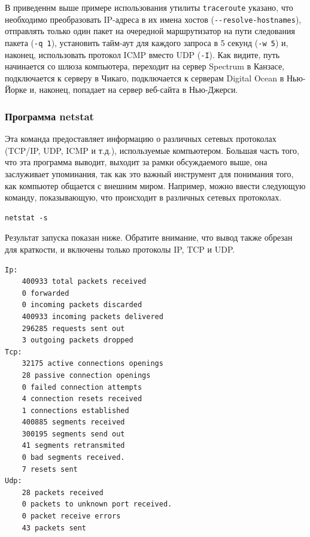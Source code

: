 \documentclass[12pt]{article}
\begin{document}
В приведеннм выше примере использования утилиты \texttt{traceroute} указано, что необходимо
преобразовать IP-адреса в их имена хостов
(\texttt{-\/-resolve-hostnames}), отправлять только один пакет на
очередной маршрутизатор на пути следования пакета (\texttt{-q\ 1}),
установить тайм-аут для каждого запроса в 5 секунд (\texttt{-w\ 5}) и,
наконец, использовать протокол ICMP вместо UDP (\texttt{-I}). Как
видите, путь начинается со шлюза компьютера, переходит на сервер
Spectrum в Канзасе, подключается к серверу в Чикаго, подключается к
серверам Digital Ocean в Нью-Йорке и, наконец, попадает на сервер
веб-сайта в Нью-Джерси. %

\hypertarget{netstat}{%
\subsubsection{\texorpdfstring{\protect\hyperlink{netstat}{}Программа
netstat}{Программа netstat}}\label{netstat}}

Эта команда предоставляет информацию о различных сетевых протоколах
(TCP/IP, UDP, ICMP и т.д.), используемые компьютером. Большая часть
того, что эта программа выводит, выходит за рамки обсуждаемого выше, она
заслуживает упоминания, так как это важный инструмент для понимания
того, как компьютер общается с внешним миром. Например, можно ввести
следующую команду, показывающую, что происходит в различных сетевых
протоколах.
\begin{verbatim}
netstat -s
\end{verbatim}

Результат запуска показан ниже. Обратите внимание, что вывод также
обрезан для краткости, и включены только протоколы IP, TCP и UDP.
\begin{verbatim}
Ip:
    400933 total packets received
    0 forwarded
    0 incoming packets discarded
    400933 incoming packets delivered
    296285 requests sent out
    3 outgoing packets dropped
Tcp:
    32175 active connections openings
    28 passive connection openings
    0 failed connection attempts
    4 connection resets received
    1 connections established
    400885 segments received
    300195 segments send out
    41 segments retransmited
    0 bad segments received.
    7 resets sent
Udp:
    28 packets received
    0 packets to unknown port received.
    0 packet receive errors
    43 packets sent
\end{verbatim}
\end{document}
